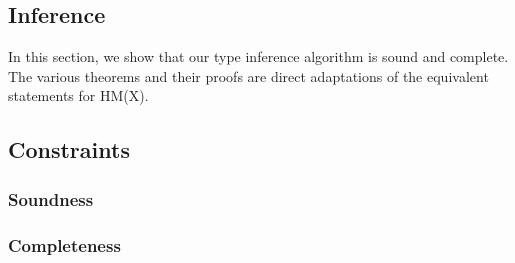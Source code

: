 \subsection{Inference}

In this section, we show that our type inference algorithm is sound and complete.
The various theorems and their proofs are direct adaptations
of the equivalent statements for HM(X).

\subsection{Constraints}



\subsubsection{Soundness}



\subsubsection{Completeness}

